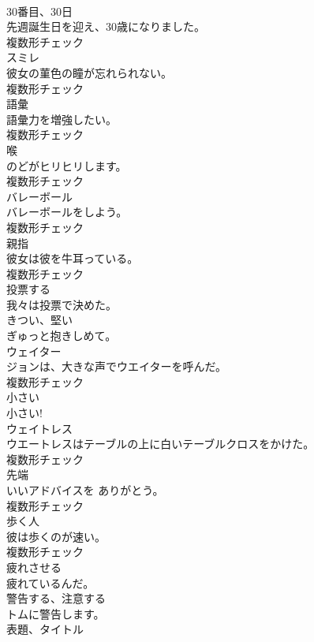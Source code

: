 \documentclass[8pt]{extreport}
\begin{document}
\begin{CJK}{UTF8}{min}
\\	[名詞]	30番目、30日	
\\	先週誕生日を迎え、30歳になりました。	
\\	複数形チェック
\\	[名詞]	スミレ	
\\	彼女の菫色の瞳が忘れられない。	
\\	複数形チェック
\\	[名詞]	語彙	
\\	語彙力を増強したい。	
\\	複数形チェック
\\	[名詞]	喉	
\\	のどがヒリヒリします。	
\\	複数形チェック
\\	[名詞]	バレーボール	
\\	バレーボールをしよう。	
\\	複数形チェック
\\	[名詞]	親指	
\\	彼女は彼を牛耳っている。	
\\	複数形チェック
\\	[動詞]	投票する	
\\	我々は投票で決めた。	
\\	[形容詞]	きつい、堅い	
\\	ぎゅっと抱きしめて。	
\\	[名詞]	ウェイター	
\\	ジョンは、大きな声でウエイターを呼んだ。	
\\	複数形チェック
\\	[形容詞]	小さい	
\\	小さい!	
\\	[名詞]	ウェイトレス	
\\	ウエートレスはテーブルの上に白いテーブルクロスをかけた。	
\\	複数形チェック
\\	[名詞]	先端	
\\	いいアドバイスを ありがとう。	
\\	複数形チェック
\\	[名詞]	歩く人	
\\	彼は歩くのが速い。	
\\	複数形チェック
\\	[動詞]	疲れさせる	
\\	疲れているんだ。	
\\	[動詞]	警告する、注意する	
\\	トムに警告します。	
\\	[名詞]	表題、タイトル	

\end{CJK}
\end{document}
